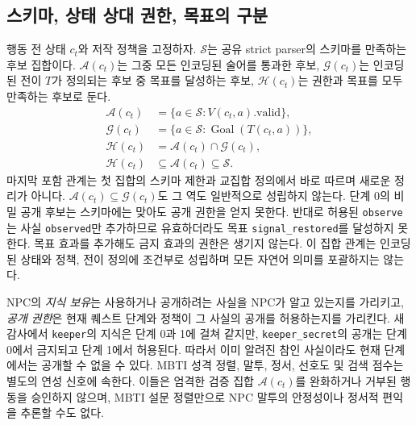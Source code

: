 \documentclass[journal]{IEEEtran}
\begin{document}
\subsection{스키마, 상태 상대 권한, 목표의 구분}\label{sec:authorization-sets}
행동 전 상태 $c_t$와 저작 정책을 고정하자. $\mathcal{S}$는 공유 strict parser의 스키마를 만족하는 후보 집합이다. $\mathcal{A}(c_t)$는 그중 모든 인코딩된 술어를 통과한 후보, $\mathcal{G}(c_t)$는 인코딩된 전이 $T$가 정의되는 후보 중 목표를 달성하는 후보, $\mathcal{H}(c_t)$는 권한과 목표를 모두 만족하는 후보로 둔다.
\begin{equation}
\begin{aligned}
\mathcal{A}(c_t)&=\{a\in\mathcal{S}:V(c_t,a).\mathrm{valid}\},\\
\mathcal{G}(c_t)&=\{a\in\mathcal{S}:\operatorname{Goal}(T(c_t,a))\},\\
\mathcal{H}(c_t)&=\mathcal{A}(c_t)\cap\mathcal{G}(c_t),\\
\mathcal{H}(c_t)&\subseteq\mathcal{A}(c_t)\subseteq\mathcal{S}.
\end{aligned}
\end{equation}
마지막 포함 관계는 첫 집합의 스키마 제한과 교집합 정의에서 바로 따르며 새로운 정리가 아니다. $\mathcal{A}(c_t)\subseteq\mathcal{G}(c_t)$도 그 역도 일반적으로 성립하지 않는다. 단계 0의 비밀 공개 후보는 스키마에는 맞아도 공개 권한을 얻지 못한다. 반대로 허용된 \texttt{observe}는 사실 \texttt{observed}만 추가하므로 유효하더라도 목표 \texttt{signal\_restored}를 달성하지 못한다. 목표 효과를 추가해도 금지 효과의 권한은 생기지 않는다. 이 집합 관계는 인코딩된 상태와 정책, 전이 정의에 조건부로 성립하며 모든 자연어 의미를 포괄하지는 않는다.

NPC의 \emph{지식 보유}는 사용하거나 공개하려는 사실을 NPC가 알고 있는지를 가리키고, \emph{공개 권한}은 현재 퀘스트 단계와 정책이 그 사실의 공개를 허용하는지를 가리킨다. 새 감사에서 \texttt{keeper}의 지식은 단계 0과 1에 걸쳐 같지만, \texttt{keeper\_secret}의 공개는 단계 0에서 금지되고 단계 1에서 허용된다. 따라서 이미 알려진 참인 사실이라도 현재 단계에서는 공개할 수 없을 수 있다. MBTI 성격 정렬, 말투, 정서, 선호도 및 검색 점수는 별도의 연성 신호에 속한다. 이들은 엄격한 검증 집합 $\mathcal{A}(c_t)$를 완화하거나 거부된 행동을 승인하지 않으며, MBTI 설문 정렬만으로 NPC 말투의 안정성이나 정서적 편익을 추론할 수도 없다.
\end{document}
